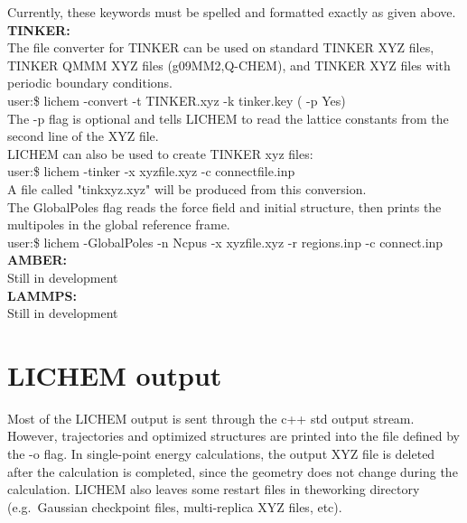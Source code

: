 \documentclass[12pt]{report}
\begin{document}
Currently, these keywords must be spelled and formatted exactly as given
above. \\

{\textbf{TINKER:}} \\

The file converter for TINKER can be used on standard TINKER XYZ files,
TINKER QMMM XYZ files (g09MM2,Q-CHEM), and TINKER XYZ files with periodic
boundary conditions. \\

user:\$ lichem -convert -t TINKER.xyz -k tinker.key ( -p Yes) \\

The -p flag is optional and tells LICHEM to read the lattice constants from
the second line of the XYZ file. \\

LICHEM can also be used to create TINKER xyz files: \\

user:\$ lichem -tinker -x xyzfile.xyz -c connectfile.inp \\

A file called "tinkxyz.xyz" will be produced from this conversion. \\

The GlobalPoles flag reads the force field and initial structure, then prints
the multipoles in the global reference frame. \\

user:\$ lichem -GlobalPoles -n Ncpus -x xyzfile.xyz -r regions.inp
 -c connect.inp \\

{\textbf{AMBER:}} \\

{\color{red}Still in development} \\

{\textbf{LAMMPS:}} \\

{\color{red}Still in development}

\section{LICHEM output}

Most of the LICHEM output is sent through the c++ std output stream.
However, trajectories and optimized structures are printed into the file
defined by the -o flag.
In single-point energy calculations, the output XYZ file is deleted after the
calculation is completed, since the geometry does not change during the
calculation.
LICHEM also leaves some restart files in theworking directory (e.g.\ Gaussian
checkpoint files, multi-replica XYZ files, etc).
\end{document}
